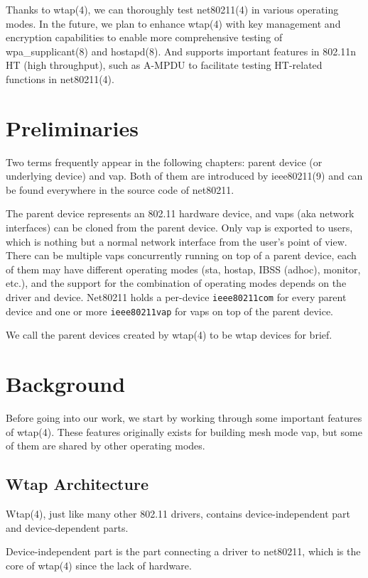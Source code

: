 \documentclass[conference]{IEEEtran}
\begin{document}
Thanks to wtap(4), we can thoroughly test net80211(4) in various operating modes. In the future, we plan to enhance wtap(4) with key management and encryption capabilities to enable more comprehensive testing of wpa\_supplicant(8) and hostapd(8). And supports important features in 802.11n HT (high throughput), such as A-MPDU to facilitate testing HT-related functions in net80211(4).


\section{Preliminaries}
Two terms frequently appear in the following chapters: parent device (or underlying device) and vap. Both of them are introduced by ieee80211(9) and can be found everywhere in the source code of net80211.

The parent device represents an 802.11 hardware device, and vaps (aka network interfaces) can be cloned from the parent device. Only vap is exported to users, which is nothing but a normal network interface from the user's point of view. There can be multiple vaps concurrently running on top of a parent device, each of them may have different operating modes (sta, hostap, IBSS (adhoc), monitor, etc.), and the support for the combination of operating modes depends on the driver and device. Net80211 holds a per-device \lstinline{ieee80211com} for every parent device and one or more \lstinline{ieee80211vap} for vaps on top of the parent device.

We call the parent devices created by wtap(4) to be wtap devices for brief.



\section{Background}
Before going into our work, we start by working through some important features of wtap(4). These features originally exists for building mesh mode vap, but some of them are shared by other operating modes. 

\subsection{Wtap Architecture}
Wtap(4), just like many other 802.11 drivers, contains device-independent part and device-dependent parts.

Device-independent part is the part connecting a driver to net80211, which is the core of wtap(4) since the lack of hardware.
\end{document}

